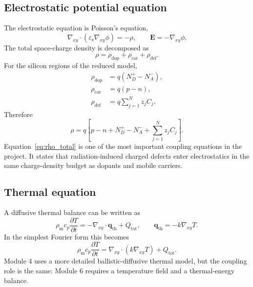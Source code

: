 \documentclass[11pt]{article}
\newcommand{\Evec}{\bm{E}}
\newcommand{\qthvec}{\bm{q}_{\mathrm{th}}}
\newcommand{\gradxy}{\nabla_{xy}}
\newcommand{\divxy}{\nabla_{xy}\cdot}
\newcommand{\epss}{\varepsilon_{\mathrm{s}}}
\newcommand{\rhom}{\rho_{\mathrm{m}}}
\newcommand{\cpsym}{c_{p}}
\begin{document}
\subsection{Electrostatic potential equation}

The electrostatic equation is Poisson's equation,
\begin{equation}
\boxed{
\divxy\left(\epss\gradxy\phi\right)=-\rho, 
\qquad
\Evec=-\gradxy\phi.}
\label{eq:poisson}
\end{equation}
The total space-charge density is decomposed as
\begin{equation}
\rho = \rho_{\mathrm{dop}}+\rho_{\mathrm{car}}+\rho_{\mathrm{def}}.
\end{equation}
For the silicon regions of the reduced model,
\begin{align}
\rho_{\mathrm{dop}} &= q\left(N_D^+-N_A^-\right), \\
\rho_{\mathrm{car}} &= q\left(p-n\right), \\
\rho_{\mathrm{def}} &= q\sum_{j=1}^{N} z_j C_j.
\end{align}
Therefore
\begin{equation}
\boxed{
\rho
=
q\left[p-n+N_D^+-N_A^-+\sum_{j=1}^{N} z_j C_j\right].}
\label{eq:rho_total}
\end{equation}
Equation~\eqref{eq:rho_total} is one of the most important coupling equations in the project. It states that radiation-induced charged defects enter electrostatics in the same charge-density budget as dopants and mobile carriers.

\subsection{Thermal equation}

A diffusive thermal balance can be written as
\begin{equation}
\boxed{
\rhom\cpsym\frac{\partial T}{\partial t}
=
-\divxy\qthvec + Q_{\mathrm{tot}},
\qquad
\qthvec=-k\gradxy T.}
\label{eq:thermal_general}
\end{equation}
In the simplest Fourier form this becomes
\begin{equation}
\boxed{
\rhom\cpsym\frac{\partial T}{\partial t}
=
\divxy\left(k\gradxy T\right)+Q_{\mathrm{tot}}.}
\label{eq:thermal_fourier}
\end{equation}
Module 4 uses a more detailed ballistic-diffusive thermal model, but the coupling role is the same: Module 6 requires a temperature field and a thermal-energy balance.
\end{document}
